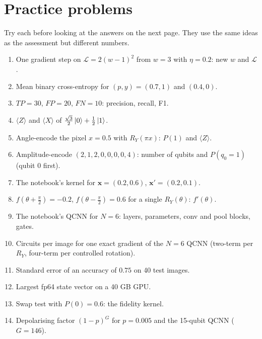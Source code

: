 \documentclass[11pt,a4paper,openany]{book}
\newcommand{\bx}{\mathbf x}
\begin{document}
\section{Practice problems}
Try each before looking at the answers on the next page. They use the same ideas as the assessment but different numbers.
\begin{enumerate}[label=\textbf{P\arabic*.}, leftmargin=2.6em, itemsep=3pt]
\item One gradient step on $\mathcal L = 2(w - 1)^2$ from $w = 3$ with $\eta = 0.2$: new $w$ and $\mathcal L$.
\item Mean binary cross-entropy for $(p, y) = (0.7, 1)$ and $(0.4, 0)$.
\item $TP = 30$, $FP = 20$, $FN = 10$: precision, recall, F1.
\item $\langle Z\rangle$ and $\langle X\rangle$ of $\frac{\sqrt3}2\ket0 + \frac12\ket1$.
\item Angle-encode the pixel $x = 0.5$ with $R_Y(\pi x)$: $P(1)$ and $\langle Z\rangle$.
\item Amplitude-encode $(2, 1, 2, 0, 0, 0, 0, 4)$: number of qubits and $P(q_0 = 1)$ (qubit 0 first).
\item The notebook's kernel for $\bx = (0.2, 0.6)$, $\bx' = (0.2, 0.1)$.
\item $f(\theta + \frac\pi2) = -0.2$, $f(\theta - \frac\pi2) = 0.6$ for a single $R_Y(\theta)$: $f'(\theta)$.
\item The notebook's QCNN for $N = 6$: layers, parameters, conv and pool blocks, gates.
\item Circuits per image for one exact gradient of the $N = 6$ QCNN (two-term per $R_Y$, four-term per controlled rotation).
\item Standard error of an accuracy of $0.75$ on 40 test images.
\item Largest fp64 state vector on a 40 GB GPU.
\item Swap test with $P(0) = 0.6$: the fidelity kernel.
\item Depolarising factor $(1 - p)^G$ for $p = 0.005$ and the 15-qubit QCNN ($G = 146$).
\end{enumerate}

\newpage
\end{document}

